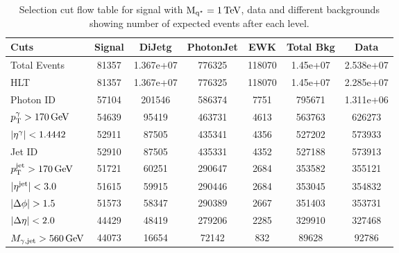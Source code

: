 \begin{table}[h!]
 \begin{center}
  \begin{tabular}{|l||c|c|c|c|c|c|}
   \hline
	Cuts                         & Signal &   DiJetg   &PhotonJet&  EWK    &Total Bkg &   Data    \\
	\hline
	Total Events                 &  81357 &  1.367e+07 &  776325 &  118070 &  1.45e+07 &  2.538e+07 \\
	HLT                          &  81357 &  1.367e+07 &  776325 &  118070 &  1.45e+07 &  2.285e+07 \\
	Photon ID                    &  57104 &  201546    &  586374 &  7751   &  795671 &  1.311e+06 \\
	$p_{\mathrm T}^{\mathrm{\gamma}}>170\mathrm{\,GeV}$ &  54639 &  95419     &  463731 &  4613   &  563763 &  626273 \\
	$\lvert \eta^{\mathrm{\gamma}} \rvert<1.4442$ &  52911 &  87505     &  435341 &  4356   &  527202 &  573933 \\
	Jet ID                       &  52910 &  87505     &  435331 &  4352   &  527188 &  573913 \\
	$p_{\mathrm T}^{\mathrm{\mathrm{jet}}}>170\mathrm{\,GeV}$   &  51721 &  60251     &  290647 &  2684   &  353582 &  355121 \\
	$\lvert \eta^{\mathrm{\mathrm{jet}}} \rvert<3.0$      &  51615 &  59915     &  290446 &  2684   &  353045 &  354832 \\
	$\lvert \Delta\phi \rvert>1.5$            &  51573 &  58347     &  290389 &  2667   &  351403 &  353731 \\
	$\lvert \Delta\eta \rvert<2.0$            &  44429 &  48419     &  279206 &  2285   &  329910 &  327468 \\
	$M_{\gamma, \mathrm{jet}}>560\mathrm{\,GeV}$     &  44073 &  16654     &  72142  &  832    &  89628  &  92786 \\
   \hline
   \hline
  \end{tabular}
  \caption{Selection cut flow table for \qstar signal with $\mathrm{M_{q^\star}}=1\mathrm{\,TeV}$, data and different backgrounds showing number of expected events after each level.}
  \label{Table:SelEff}
 \end{center}
\end{table}
